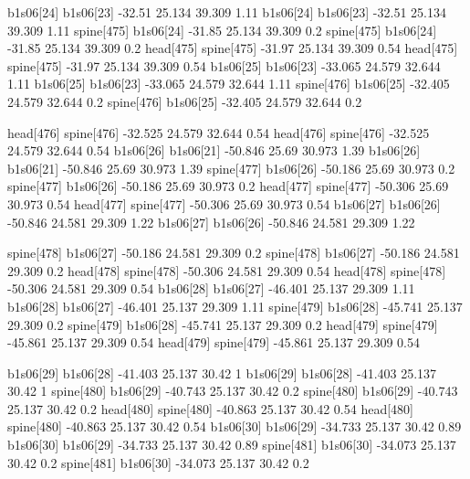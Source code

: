 b1s06[24]    b1s06[23]    -32.51    25.134    39.309    1.11
b1s06[24]    b1s06[23]    -32.51    25.134    39.309    1.11
spine[475]    b1s06[24]    -31.85    25.134    39.309    0.2
spine[475]    b1s06[24]    -31.85    25.134    39.309    0.2
head[475]    spine[475]    -31.97    25.134    39.309    0.54
head[475]    spine[475]    -31.97    25.134    39.309    0.54
b1s06[25]    b1s06[23]    -33.065    24.579    32.644    1.11
b1s06[25]    b1s06[23]    -33.065    24.579    32.644    1.11
spine[476]    b1s06[25]    -32.405    24.579    32.644    0.2
spine[476]    b1s06[25]    -32.405    24.579    32.644    0.2


head[476]    spine[476]    -32.525    24.579    32.644    0.54
head[476]    spine[476]    -32.525    24.579    32.644    0.54
b1s06[26]    b1s06[21]    -50.846    25.69    30.973    1.39
b1s06[26]    b1s06[21]    -50.846    25.69    30.973    1.39
spine[477]    b1s06[26]    -50.186    25.69    30.973    0.2
spine[477]    b1s06[26]    -50.186    25.69    30.973    0.2
head[477]    spine[477]    -50.306    25.69    30.973    0.54
head[477]    spine[477]    -50.306    25.69    30.973    0.54
b1s06[27]    b1s06[26]    -50.846    24.581    29.309    1.22
b1s06[27]    b1s06[26]    -50.846    24.581    29.309    1.22


spine[478]    b1s06[27]    -50.186    24.581    29.309    0.2
spine[478]    b1s06[27]    -50.186    24.581    29.309    0.2
head[478]    spine[478]    -50.306    24.581    29.309    0.54
head[478]    spine[478]    -50.306    24.581    29.309    0.54
b1s06[28]    b1s06[27]    -46.401    25.137    29.309    1.11
b1s06[28]    b1s06[27]    -46.401    25.137    29.309    1.11
spine[479]    b1s06[28]    -45.741    25.137    29.309    0.2
spine[479]    b1s06[28]    -45.741    25.137    29.309    0.2
head[479]    spine[479]    -45.861    25.137    29.309    0.54
head[479]    spine[479]    -45.861    25.137    29.309    0.54


b1s06[29]    b1s06[28]    -41.403    25.137    30.42    1
b1s06[29]    b1s06[28]    -41.403    25.137    30.42    1
spine[480]    b1s06[29]    -40.743    25.137    30.42    0.2
spine[480]    b1s06[29]    -40.743    25.137    30.42    0.2
head[480]    spine[480]    -40.863    25.137    30.42    0.54
head[480]    spine[480]    -40.863    25.137    30.42    0.54
b1s06[30]    b1s06[29]    -34.733    25.137    30.42    0.89
b1s06[30]    b1s06[29]    -34.733    25.137    30.42    0.89
spine[481]    b1s06[30]    -34.073    25.137    30.42    0.2
spine[481]    b1s06[30]    -34.073    25.137    30.42    0.2


